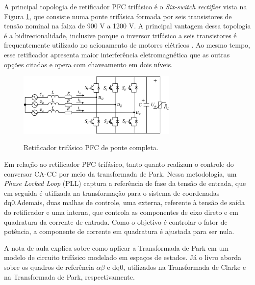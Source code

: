 A principal topologia de retificador PFC trifásico é o \textit{Six-switch rectifier} vista na
Figura \ref{fig:pfc_six_switch}, que consiste numa ponte trifásica formada por seis
transistores de tensão nominal na faixa de 900 V a 1200 V. A principal vantagem dessa topologia
é a bidirecionalidade, inclusive porque o inversor trifásico a seis transistores é
frequentemente utilizado no acionamento de motores elétricos \cite{onsemi_h2ptoday2102}. Ao
mesmo tempo, esse retificador apresenta maior interferência eletromagnética que as outras
opções citadas e opera com chaveamento em dois níveis.

\begin{figure}
	\centering
	\caption{Retificador trifásico PFC de ponte completa.}
	\includegraphics[width=0.7\textwidth]{./Figuras/retificador_six_switch.png}
	\label{fig:pfc_six_switch}
\end{figure}


Em relação ao retificador PFC trifásico, tanto \cite{3phPlecs} quanto \cite{WANG2013/03}
realizam o controle do conversor CA-CC por meio da transformada de Park. Nessa metodologia, um
\textit{Phase Locked Loop} (PLL) captura a referência de fase da tensão de entrada, que em
seguida é utilizada na transformação para o sistema de coordenadas dq0.Ademais, duas malhas de
controle, uma externa, referente à tensão de saída do retificador e uma interna, que controla
as componentes de eixo direto e em quadratura da corrente de entrada. Como o objetivo é
controlar o fator de potência, a componente de corrente em quadratura é ajustada para ser nula.

A nota de aula \cite{dq0_transform} explica sobre como aplicar a Transformada de Park em um
modelo de circuito trifásico modelado em espaços de estados. Já o livro \cite{} aborda sobre os
quadros de referência \(\alpha \beta\) e dq0, utilizados na Transformada de Clarke e na
Transformada de Park, respectivamente.


